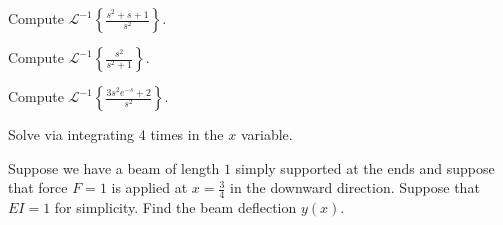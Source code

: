 \documentclass{ximera}
\begin{document}
\begin{exercise}
    Compute ${\mathcal{L}}^{-1} \left\{ \frac{s^2+s+1}{s^2} \right\}$.
\end{exercise}

\begin{exercise}%
    Compute ${\mathcal{L}}^{-1} \left\{ \frac{s^2}{s^2+1} \right\}$.
\end{exercise}

\begin{exercise}%
    Compute ${\mathcal{L}}^{-1} \left\{ \frac{3 s^2 e^{-s} + 2}{s^2} \right\}$.
\end{exercise}

\begin{exercise}%
    Solve  via integrating 4 times in the $x$ variable.
\end{exercise}

\begin{exercise}
    Suppose we have a beam of length $1$ simply supported at the ends and suppose that force $F=1$ is applied at $x=\frac{3}{4}$ in the downward direction.  Suppose that $EI=1$ for simplicity.  Find the beam deflection $y(x)$.
\end{exercise}
%
\end{document}
